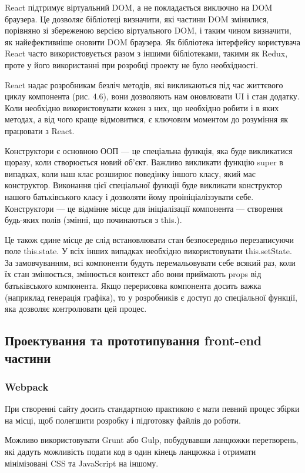 React підтримує віртуальний DOM, а не покладається виключно на DOM браузера. Це дозволяє бібліотеці визначити, які частини DOM змінилися, порівняно зі збереженою версією віртуального DOM, і таким чином визначити, як найефективніше оновити DOM браузера. Як бібліотека інтерфейсу користувача React часто використовується разом з іншими бібліотеками, такими як Redux, проте у його використанні при розробці проекту не було необхідності.

React надає розробникам безліч методів, які викликаються під час життєвого циклу компонента (рис. 4.6), вони дозволяють нам оновлювати UI і стан додатку. Коли необхідно використовувати кожен з них, що необхідно робити і в яких методах, а від чого краще відмовитися, є ключовим моментом до розуміння як працювати з React.

Конструктори є основною ООП — це спеціальна функція, яка буде викликатися щоразу, коли створюється новий об'єкт. Важливо викликати функцію super в випадках, коли наш клас розширює поведінку іншого класу, який має конструктор. Виконання цієї спеціальної функції буде викликати конструктор нашого батьківського класу і дозволяти йому проініціаліззувати себе. 
Конструктори —  це відмінне місце для ініціалізації компонента —  створення будь-яких полів (змінні, що починаються з this.).

Це також єдине місце де слід встановлювати стан безпосередньо перезаписуючи поле this.state. У всіх інших випадках необхідно використовувати this.setState.
За замовчуванням, всі компоненти будуть перемальовувати себе всякий раз, коли їх стан змінюється, змінюється контекст або вони приймають props від батьківського компонента. Якщо перерисовка компонента досить важка (наприклад генерація графіка), то у розробників є доступ до спеціальної функції, яка дозволяє контролювати цей процес.

\subsection{Проектування та прототипування front-end частини}

\subsubsection{Webpack}

При створенні сайту досить стандартною практикою є мати певний процес збірки на місці, щоб полегшити розробку і підготовку файлів до роботи.

Можливо використовувати Grunt або Gulp, побудувавши ланцюжки перетворень, які дадуть можливість подати код в один кінець ланцюжка і отримати мінімізовані CSS та JavaScript на іншому.

